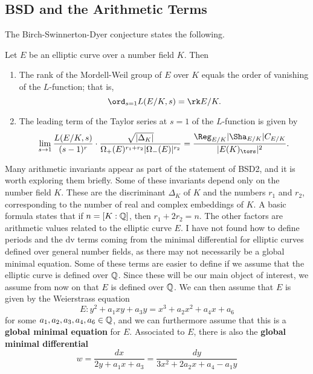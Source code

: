 \subsection{BSD and the Arithmetic Terms}

The Birch-Swinnerton-Dyer conjecture states the following.

\begin{conj}[BSD]
    Let $E$ be an elliptic curve over a number field $K$. Then 
    \begin{enumerate}[label={\bfseries  BSD\arabic*.}]
        \item The rank of the Mordell-Weil group of $E$ over $K$ equals the order of vanishing of the $L$-function; that is,
        $$\ord_{s=1}L(E/K,s)=\rk E/K.$$
        \item The leading term of the Taylor series at $s=1$ of the $L$-function is given by 
        \begin{equation}\label{BSD_2}
            \lim_{s\to1}\frac{L(E/K,s)}{(s-1)^r}\cdot\frac{\sqrt{|\Delta_K|}}{\Omega_+(E)^{r_1+r_2}|\Omega_-(E)|^{r_2}}=\frac{\Reg_{E/K}|\Sha_{E/K}|C_{E/K}}{|E(K)_{\tors}|^2}.
        \end{equation}
    \end{enumerate}
\end{conj}

Many arithmetic invariants appear as part of the statement of BSD2, and it is worth exploring them briefly. Some of these invariants depend only on the number field $K$. These are the discriminant $\Delta_K$ of $K$ and the numbers $r_1$ and $r_2$, corresponding to the number of real and complex embeddings of $K$. A basic formula states that if $n=[K:\mathbb{Q}]$, then $r_1+2r_2=n$. The other factors are arithmetic values related to the elliptic curve $E$. {\color{red} I have not found how to define periods and the dv terms coming from the minimal differential for elliptic curves defined over general number fields, as there may not necessarily be a global minimal equation.} Some of these terms are easier to define if we assume that the elliptic curve is defined over $\mathbb{Q}$. Since these will be our main object of interest, we assume from now on that $E$ is defined over $\mathbb{Q}$. We can then assume that $E$ is given by the Weierstrass equation 
$$E:y^2+a_1xy+a_3y=x^3+a_2x^2+a_4x+a_6$$ 
for some $a_1,a_2,a_3,a_4,a_6\in\mathbb{Q}$, and we can furthermore assume that this is a \textbf{global minimal equation} for $E$. Associated to $E$, there is also the \textbf{global minimal differential}
$$w=\frac{dx}{2y+a_1x+a_3}=\frac{dy}{3x^2+2a_2x+a_4-a_1y}$$ 


